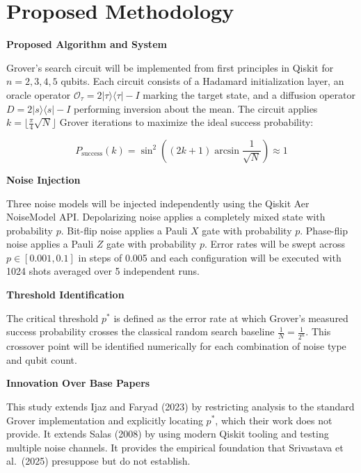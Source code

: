 \documentclass[12pt, a4paper]{article}
\begin{document}
\section{Proposed Methodology}

\textbf{Proposed Algorithm and System}

Grover's search circuit will be implemented from first principles in Qiskit for
$n = 2, 3, 4, 5$ qubits. Each circuit consists of a Hadamard initialization layer,
an oracle operator $\mathcal{O}_\tau = 2|\tau\rangle\langle\tau| - I$ marking the
target state, and a diffusion operator $D = 2|s\rangle\langle s| - I$ performing
inversion about the mean. The circuit applies $k = \lfloor \frac{\pi}{4}\sqrt{N}
\rfloor$ Grover iterations to maximize the ideal success probability:

\begin{equation}
  P_{\text{success}}(k) = \sin^2\!\left((2k+1)\arcsin\frac{1}{\sqrt{N}}\right)
  \approx 1
\end{equation}

\textbf{Noise Injection}

Three noise models will be injected independently using the Qiskit Aer NoiseModel
API. Depolarizing noise applies a completely mixed state with probability $p$.
Bit-flip noise applies a Pauli $X$ gate with probability $p$. Phase-flip noise
applies a Pauli $Z$ gate with probability $p$. Error rates will be swept across
$p \in [0.001, 0.1]$ in steps of 0.005 and each configuration will be executed
with 1024 shots averaged over 5 independent runs.

\textbf{Threshold Identification}

The critical threshold $p^{*}$ is defined as the error rate at which Grover's
measured success probability crosses the classical random search baseline
$\frac{1}{N} = \frac{1}{2^{n}}$. This crossover point will be identified
numerically for each combination of noise type and qubit count.

\textbf{Innovation Over Base Papers}

This study extends Ijaz and Faryad (2023) by restricting analysis to the standard
Grover implementation and explicitly locating $p^{*}$, which their work does not
provide. It extends Salas (2008) by using modern Qiskit tooling and testing
multiple noise channels. It provides the empirical foundation that Srivastava
et al.\ (2025) presuppose but do not establish.
\end{document}
